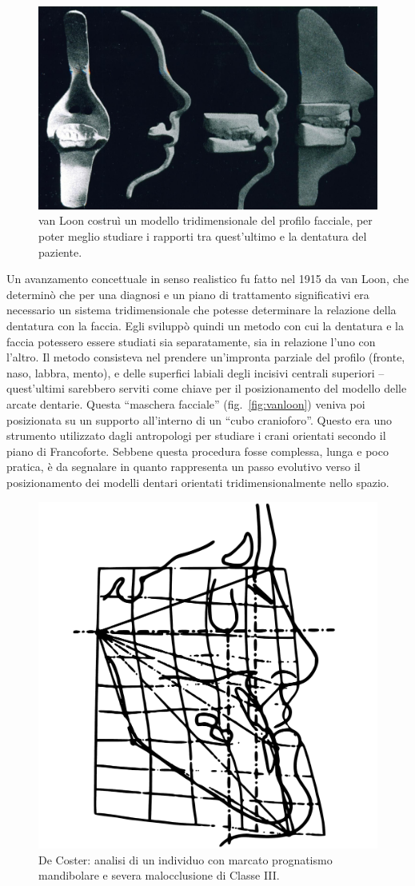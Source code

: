 \begin{figure}
\centering
\includegraphics[width=.7\textwidth]{./images/vanloon.jpg}
\caption{van Loon costruì un modello tridimensionale del profilo facciale, per poter meglio studiare i rapporti tra quest'ultimo e la dentatura del paziente.}
\label{fig:vanloon}
\end{figure}

Un avanzamento concettuale in senso realistico fu fatto nel 1915 da van Loon, che determinò che per una diagnosi e un piano di trattamento significativi era necessario un sistema tridimensionale che potesse determinare la relazione della dentatura con la faccia. Egli sviluppò quindi un metodo con cui la dentatura e la faccia potessero essere studiati sia separatamente, sia in relazione l'uno con l'altro. Il metodo consisteva nel prendere un'impronta parziale del profilo (fronte, naso, labbra, mento), e delle superfici labiali degli incisivi centrali superiori -- quest'ultimi sarebbero serviti come chiave per il posizionamento del modello delle arcate dentarie. Questa ``maschera facciale'' (fig.~\vref{fig:vanloon}) veniva poi posizionata su un supporto all'interno di un ``cubo cranioforo''. Questo era uno strumento utilizzato dagli antropologi per studiare i crani orientati secondo il piano di Francoforte. Sebbene questa procedura fosse complessa, lunga e poco pratica, è da segnalare in quanto rappresenta un passo evolutivo verso il posizionamento dei modelli dentari orientati tridimensionalmente nello spazio.

\begin{figure}
\centering
\includegraphics[width=.45\textwidth]{./images/decoster.pdf}
\caption{De Coster: analisi di un individuo con marcato prognatismo mandibolare e severa malocclusione di Classe III.}
\label{fig:decoster}
\end{figure}

